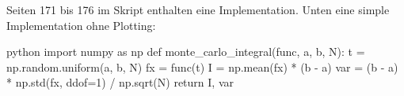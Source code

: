 Seiten 171 bis 176 im Skript enthalten eine Implementation. Unten eine simple Implementation ohne Plotting:
\begin{code}{python}
    import numpy as np
    def monte_carlo_integral(func, a, b, N):
        t = np.random.uniform(a, b, N)
        fx = func(t)
        I = np.mean(fx) * (b - a)
        var = (b - a) * np.std(fx, ddof=1) / np.sqrt(N)
        return I, var
\end{code}
